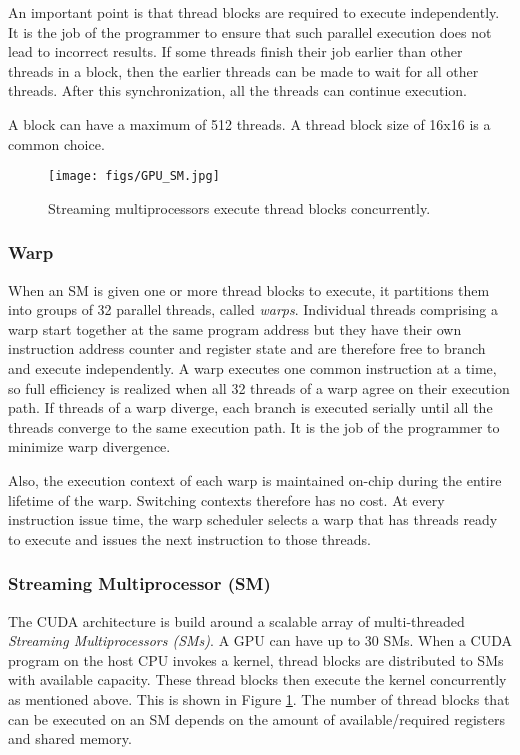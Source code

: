 \documentclass{article}
\begin{document}
An important point is that thread blocks are required to execute independently.  It is the job of the programmer to ensure that such parallel execution does not lead to incorrect results.  If some threads finish their job earlier than other threads in a block, then the earlier threads can be made to wait for all other threads.  After this synchronization, all the threads can continue execution.  

A block can have a maximum of 512 threads.  A thread block size of 16x16 is a common choice.  

\begin{figure}[h]
	\centering
	\texttt{[image: figs/GPU\_SM.jpg]}
	\caption{Streaming multiprocessors execute thread blocks concurrently.} 	
	\label{fig:GPU_SM}	
\end{figure}
\subsubsection{Warp}
When an SM is given one or more thread blocks to execute, it partitions them into groups of 32 parallel threads, called \emph{warps}.  Individual threads comprising a warp start together at the same program address but they have their own instruction address counter and register state and are therefore free to branch and execute independently.  A warp executes one common instruction at a time, so full efficiency is realized when all 32 threads of a warp agree on their execution path.  If threads of a warp diverge, each branch is executed serially until all the threads converge to the same execution path.  It is the job of the programmer to minimize warp divergence.  

Also, the execution context of each warp is maintained on-chip during the entire lifetime of the warp.  Switching contexts therefore has no cost.  At every instruction issue time, the warp scheduler selects a warp that has threads ready to execute and issues the next instruction to those threads.

\subsubsection{Streaming Multiprocessor (SM)}
The CUDA architecture is build around a scalable array of multi-threaded \emph{Streaming Multiprocessors (SMs)}.   A GPU can have up to 30 SMs.  When a CUDA program on the host CPU invokes a kernel, thread blocks are distributed to SMs with available capacity.  These thread blocks then execute the kernel concurrently as mentioned above.  This is shown in Figure \ref{fig:GPU_SM}.  The number of thread blocks that can be executed on an SM depends on the amount of available/required registers and shared memory.  
\end{document}
